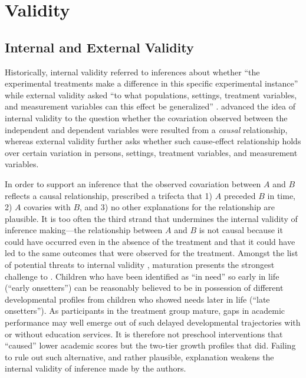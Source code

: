 \section{Validity}

\subsection{Internal and External Validity}

Historically, internal validity referred to inferences about whether ``the experimental treatments make a difference in this specific experimental instance'' while external validity asked ``to what populations, settings, treatment variables, and measurement variables can this effect be generalized'' \parencite[][p. 5]{campbell:1963}. \textcite{cook:1979} advanced the idea of internal validity to the question whether the covariation observed between the independent and dependent variables were resulted from a \emph{causal} relationship, whereas external validity further asks whether such cause-effect relationship holds over certain variation in persons, settings, treatment variables, and measurement variables.

In order to support an inference that the observed covariation between $A$ and $B$ reflects a causal relationship, \textcite{shadish:2002} prescribed a trifecta that 1) $A$ preceded $B$ in time, 2) $A$ covaries with $B$, and 3) no other explanations for the relationship are plausible. It is too often the third strand that undermines the internal validity of inference making---the relationship between $A$ and $B$ is not causal because it could have occurred even in the absence of the treatment and that it could have led to the same outcomes that were observed for the treatment. Amongst the list of potential threats to internal validity \parencite[][p. 54--61]{shadish:2002}, maturation presents the strongest challenge to \textcite{sullivan:2013}. Children who have been identified as ``in need'' so early in life (``early onsetters'') can be reasonably believed to be in possession of different developmental profiles from children who showed needs later in life (``late onsetters''). As participants in the treatment group mature, gaps in academic performance may well emerge out of such delayed developmental trajectories with or without education services. It is therefore not preschool interventions that ``caused'' lower academic scores but the two-tier growth profiles that did. Failing to rule out such alternative, and rather plausible, explanation weakens the internal validity of inference made by the authors.

